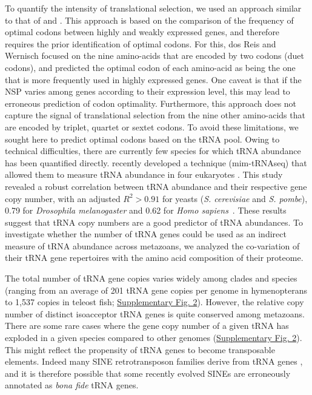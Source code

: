 To quantify the intensity of translational selection, we used an approach similar to that of \citet{dos_reis_estimating_2009} and \citet{sharp_variation_2005}. This approach is based on the comparison of the frequency of optimal codons between highly and weakly expressed genes, and therefore requires the prior identification of optimal codons. For this, dos Reis and Wernisch focused on the nine amino-acids that are encoded by two codons (duet codons), and predicted the optimal codon of each amino-acid as being the one that is more frequently used in highly expressed genes. One caveat is that if the NSP varies among genes according to their expression level, this may lead to erroneous prediction of codon optimality. Furthermore, this approach does not capture the signal of translational selection from the nine other amino-acids that are encoded by triplet, quartet or sextet codons. To avoid these limitations, we sought here to predict optimal codons based on the tRNA pool. Owing to technical difficulties, there are currently few species for which tRNA abundance has been quantified directly. \citet{behrens_high-resolution_2021} recently developed a technique (mim-tRNAseq) that allowed them to measure tRNA abundance in four eukaryotes \citep{behrens_high-resolution_2021}. This study revealed a robust correlation between tRNA abundance and their respective gene copy number, with an adjusted $R^2 > 0.91$ for yeasts (\textit{S. cerevisiae} and \textit{S. pombe}), 0.79 for \textit{Drosophila melanogaster} and 0.62 for \textit{Homo sapiens}~\citep{behrens_high-resolution_2021}. These results suggest that tRNA copy numbers are a good predictor of tRNA abundances. To investigate whether the number of tRNA genes could be used as an indirect measure of tRNA abundance across metazoans, we analyzed the co-variation of their tRNA gene repertoires with the amino acid composition of their proteome.

The total number of tRNA gene copies varies widely among clades and species (ranging from an average of 201 tRNA gene copies per genome in hymenopterans to 1,537 copies in teleost fish; \hyperref[suppfig:CU2]{Supplementary Fig. 2}). However, the relative copy number of distinct isoacceptor tRNA genes is quite conserved among metazoans. There are some rare cases where the gene copy number of a given tRNA has exploded in a given species compared to other genomes (\hyperref[suppfig:CU2]{Supplementary Fig. 2}). This might reflect the propensity of tRNA genes to become transposable elements. Indeed many SINE retrotransposon families derive from tRNA genes \citep{sun_common_2007}, and it is therefore possible that some recently evolved SINEs are erroneously annotated as \textit{bona fide} tRNA genes.


